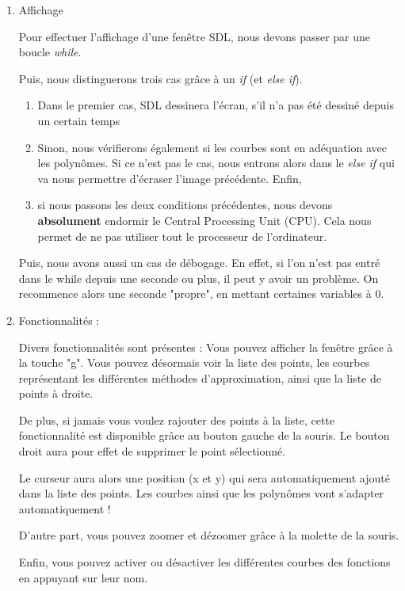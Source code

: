 \documentclass[letter]{article}
\begin{document}
\begin{enumerate}
\item Affichage
\label{sec:orgef1d22a}

Pour effectuer l'affichage d'une fenêtre SDL, nous devons passer par une boucle \emph{while}.

Puis, nous distinguerons trois cas grâce à un \emph{if} (et \emph{else if}).

\begin{enumerate}
\item Dans le premier cas, SDL dessinera l'écran, s'il n'a pas été dessiné depuis un certain temps
\item Sinon, nous vérifierons également si les courbes sont en adéquation avec les polynômes. Si ce n'est pas le cas, nous entrons alors dans le \emph{else if} qui va nous permettre d'écraser l'image précédente. Enfin,
\item si nous passons les deux conditions précédentes, nous devons \textbf{absolument} endormir le Central Processing Unit (CPU). Cela nous permet de ne pas utiliser tout le processeur de l'ordinateur.
\end{enumerate}

Puis, nous avons aussi un cas de débogage. En effet, si l'on n'est pas entré dans le while depuis une seconde ou plus, il peut y avoir un problème. On recommence alors une seconde "propre", en mettant certaines variables à 0.








\item Fonctionnalités :
\label{sec:orgc4502d9}

Divers fonctionnalités sont présentes :
Vous pouvez afficher la fenêtre grâce à la touche "g". Vous pouvez désormais voir la liste des points, les courbes représentant les différentes méthodes d'approximation, ainsi que la liste de points à droite.

De plus, si jamais vous voulez rajouter des points à la liste, cette fonctionnalité est disponible grâce au bouton gauche de la souris. Le bouton droit aura pour effet de supprimer le point sélectionné.

Le curseur aura alors une position (x et y) qui sera automatiquement ajouté dans la liste des points. Les courbes ainsi que les polynômes vont s'adapter automatiquement !

D'autre part, vous pouvez zoomer et dézoomer grâce à la molette de la souris.

Enfin, vous pouvez activer ou désactiver les différentes courbes des fonctions en appuyant sur leur nom.
\end{enumerate}
\end{document}
